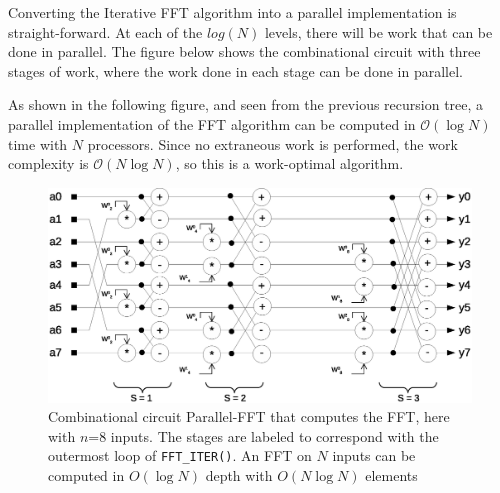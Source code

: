 Converting the Iterative FFT algorithm into a parallel implementation is straight-forward. At each of the $log(N)$ levels, there will be work that can be done in parallel. The figure below shows the combinational circuit with three stages of work, where the work done in each stage can be done in parallel.

As shown in the following figure, and seen from the previous recursion tree, a parallel implementation of the FFT algorithm can be computed in $\mathcal{O}(\log N)$ time with $N$ processors. Since no extraneous work is performed, the work complexity is $\mathcal{O}(N\log N)$, so this is a work-optimal algorithm. 

\begin{figure}[h]
\center
\includegraphics[scale=0.45]{img/parallel_fft_circuit.eps}
\caption{Combinational circuit Parallel-FFT that computes the FFT, here with $n$=8 inputs. The stages are labeled to correspond with the outermost loop of \texttt{FFT\_ITER()}. An FFT on $N$ inputs can be computed in $O(\log N)$ depth with $O(N \log N)$ elements}
\end{figure}